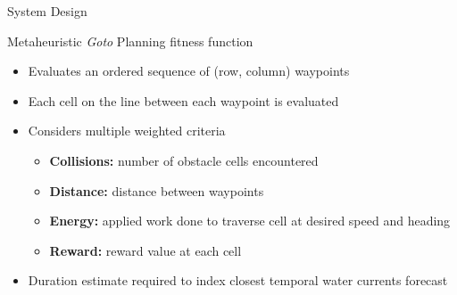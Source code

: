 \documentclass[9pt]{beamer}
\begin{document}
\begin{frame}{System Design}
    \begin{block}{Metaheuristic \textit{Goto} Planning fitness function}
	    \begin{itemize}
	        \item Evaluates an ordered sequence of (row, column) waypoints
	        \item Each cell on the line between each waypoint is evaluated
	        \item Considers multiple weighted criteria
	        \begin{itemize}
	            \item \textbf{Collisions:} number of obstacle cells encountered
	            \item \textbf{Distance:} distance between waypoints
	            \item \textbf{Energy:} applied work done to traverse cell at desired speed and heading
	            \item \textbf{Reward:} reward value at each cell
	        \end{itemize}
	        \item Duration estimate required to index closest temporal water currents forecast
        \end{itemize}
    \end{block}


\end{frame}
\end{document}
